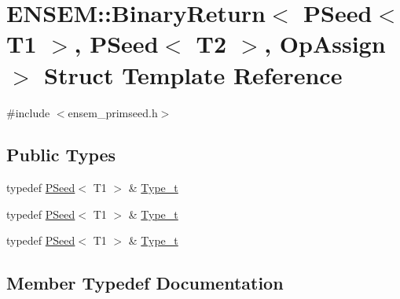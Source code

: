 \hypertarget{structENSEM_1_1BinaryReturn_3_01PSeed_3_01T1_01_4_00_01PSeed_3_01T2_01_4_00_01OpAssign_01_4}{}\section{E\+N\+S\+EM\+:\+:Binary\+Return$<$ P\+Seed$<$ T1 $>$, P\+Seed$<$ T2 $>$, Op\+Assign $>$ Struct Template Reference}
\label{structENSEM_1_1BinaryReturn_3_01PSeed_3_01T1_01_4_00_01PSeed_3_01T2_01_4_00_01OpAssign_01_4}


{\ttfamily \#include $<$ensem\+\_\+primseed.\+h$>$}

\subsection*{Public Types}
\begin{DoxyCompactItemize}
\item 
typedef \mbox{\hyperlink{classENSEM_1_1PSeed}{P\+Seed}}$<$ T1 $>$ \& \mbox{\hyperlink{structENSEM_1_1BinaryReturn_3_01PSeed_3_01T1_01_4_00_01PSeed_3_01T2_01_4_00_01OpAssign_01_4_a14ba5023d53a2620dfd0bbb617d040c6}{Type\+\_\+t}}
\item 
typedef \mbox{\hyperlink{classENSEM_1_1PSeed}{P\+Seed}}$<$ T1 $>$ \& \mbox{\hyperlink{structENSEM_1_1BinaryReturn_3_01PSeed_3_01T1_01_4_00_01PSeed_3_01T2_01_4_00_01OpAssign_01_4_a14ba5023d53a2620dfd0bbb617d040c6}{Type\+\_\+t}}
\item 
typedef \mbox{\hyperlink{classENSEM_1_1PSeed}{P\+Seed}}$<$ T1 $>$ \& \mbox{\hyperlink{structENSEM_1_1BinaryReturn_3_01PSeed_3_01T1_01_4_00_01PSeed_3_01T2_01_4_00_01OpAssign_01_4_a14ba5023d53a2620dfd0bbb617d040c6}{Type\+\_\+t}}
\end{DoxyCompactItemize}


\subsection{Member Typedef Documentation}
\mbox{\label{structENSEM_1_1BinaryReturn_3_01PSeed_3_01T1_01_4_00_01PSeed_3_01T2_01_4_00_01OpAssign_01_4_a14ba5023d53a2620dfd0bbb617d040c6}} 

